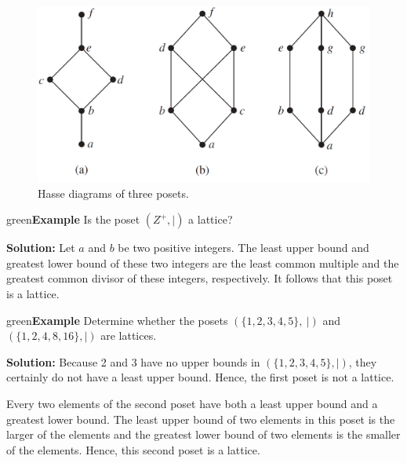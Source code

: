 \documentclass[11pt]{article}
\newenvironment{example}[1][\unskip]{\begin{mybox}{green}{\textbf{Example} {#1}}}{\end{mybox}}
\begin{document}
\begin{figure}[h!]
    \centering
    \includegraphics[width=.7\textwidth]{img/ch9.6-f8.png}
    \caption{Hasse diagrams of three posets.}
    \label{fig:my_label}
\end{figure}

\begin{example}
Is the poset $(Z^+, |)$ a lattice?

\textbf{Solution:} Let $a$ and $b$ be two positive integers. The least upper bound and greatest lower bound of these two integers are the least common multiple and the greatest common divisor of these integers, respectively. It follows that this poset is a lattice.
\end{example}

\begin{example}
Determine whether the posets $(\{1, 2, 3, 4, 5\},\ |)$ and $(\{1, 2, 4, 8, 16\}, |)$ are lattices.

\textbf{Solution:}
Because 2 and 3 have no upper bounds in $(\{1, 2, 3, 4, 5\}, |)$, they certainly do not have a least upper bound. Hence, the first poset is not a lattice.

Every two elements of the second poset have both a least upper bound and a greatest lower bound. The least upper bound of two elements in this poset is the larger of the elements and the greatest lower bound of two elements is the smaller of the elements. Hence, this second poset is a lattice.
\end{example}
\end{document}
